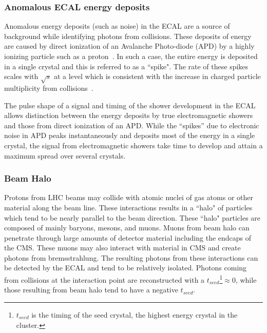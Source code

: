 \subsubsection{Anomalous ECAL energy deposits}\label{Se:Spikes}
Anomalous energy deposits (such as noise) in the ECAL are a source of background while identifying photons from \pp collisions. These deposits 
of energy are caused by direct ionization of an Avalanche Photo-diode (APD) by a highly ionizing particle such as a proton~\cite{CMS-NOTE-2010-012}. In such 
a case, the entire energy is deposited in a single crystal and this is referred to as a ``spike". The rate of these spikes scales with $\sqrt{s}$ at 
a level which is consistent with the increase in charged particle multiplicity from \pp collisions~\cite{Khachatryan:2010us}.

The pulse shape of a signal and timing of the shower development in the ECAL allows distinction between the energy deposits by true electromagnetic 
showers and those from direct ionization of an APD. While the ``spikes'' due to electronic noise in APD peaks instantaneously and deposits most
of the energy in a single crystal, the signal from electromagnetic showers take time to develop and attain a maximum spread over several crystals.

\subsubsection{Beam Halo}
Protons from LHC beams may collide with atomic nuclei of gas atoms or other material along the beam line. 
These interactions results in a ``halo" of particles which tend to be nearly parallel to the beam direction. These ``halo" particles are
composed of mainly baryons, mesons, and muons. Muons from beam halo can penetrate through large amounts of detector material including the 
endcaps of the CMS. These muons may also interact with material in CMS and create photons from bremsstrahlung. The resulting photons from these
interactions can be detected by the ECAL and tend to be relatively isolated. Photons coming from \pp collisions at the interaction 
point are reconstructed with a $t_{seed}$\footnote{$t_{seed}$ is the timing of the seed crystal, the highest energy crystal in the cluster.}$\approx0$, 
while those resulting from beam halo tend to have a negative $t_{seed}$.

